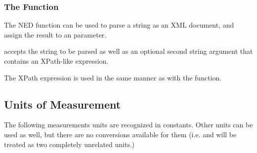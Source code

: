 \subsubsection{The  Function}
\label{sec:ned-ref:xml-function}

The  NED function can be used to parse a string as an
XML document, and assign the result to an  parameter.

 accepts the string to be parsed as well as an optional
second string argument that contains an XPath-like expression.

The XPath expression is used in the same manner as with the
 function.


\subsection{Units of Measurement}
\label{sec:ned-ref:units}

The following measurements units are recognized in constants. Other units can
be used as well, but there are no conversions available for them (i.e.
 and  will be treated as two completely unrelated
units.)

